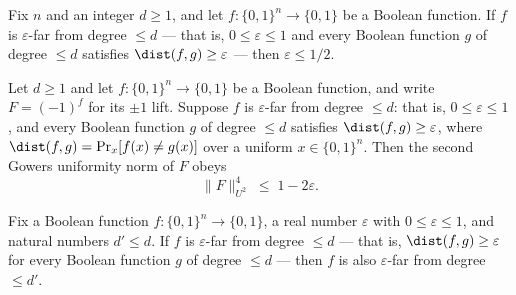 \begin{lemma}
\label{LowDegreeTest.eps_le_half_of_far}
\leanok
{}
Fix $n$ and an integer $d \ge 1$, and let $f : \{0,1\}^n \to \{0,1\}$ be a Boolean
function. If $f$ is $\varepsilon$-far from degree $\le d$ — that is, $0 \le \varepsilon
\le 1$ and every Boolean function $g$ of degree $\le d$ satisfies $\dist(f,g) \ge
\varepsilon$ — then $\varepsilon \le 1/2$.
\end{lemma}

\begin{lemma}
\label{LowDegreeTest.gowers_norm_le_of_far_d1}
\leanok
{}
Let $d \ge 1$ and let $f : \{0,1\}^n \to \{0,1\}$ be a Boolean function, and write $F =
(-1)^f$ for its $\pm 1$ lift. Suppose $f$ is $\varepsilon$-far from degree $\le d$: that
is, $0 \le \varepsilon \le 1$, and every Boolean function $g$ of degree $\le d$
satisfies $\dist(f,g) \ge \varepsilon$, where $\dist(f,g) = \Pr_{x}[f(x) \ne g(x)]$ over
a uniform $x \in \{0,1\}^n$. Then the second Gowers uniformity norm of $F$ obeys
\[
  \|F\|_{U^2}^{4} \;\le\; 1 - 2\varepsilon .
\]
\end{lemma}

\begin{lemma}
\label{LowDegreeTest.epsilon_far_monotone}
\leanok
{}
Fix a Boolean function $f : \{0,1\}^n \to \{0,1\}$, a real number $\varepsilon$ with $0
\le \varepsilon \le 1$, and natural numbers $d' \le d$. If $f$ is $\varepsilon$-far from
degree $\le d$ — that is, $\dist(f, g) \ge \varepsilon$ for every Boolean function $g$
of degree $\le d$ — then $f$ is also $\varepsilon$-far from degree $\le d'$.
\end{lemma}

